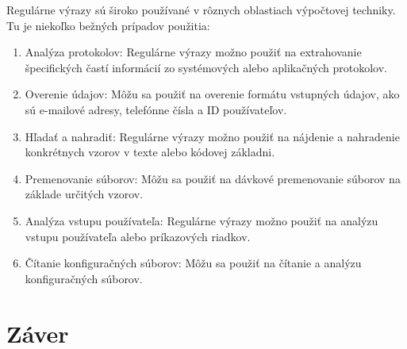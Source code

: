 \documentclass[10pt,twoside,slovak,a4paper]{article}
\begin{document}
	Regulárne výrazy sú široko používané v rôznych oblastiach výpočtovej techniky. Tu je niekoľko bežných prípadov použitia:
	\begin{enumerate}
		\item Analýza protokolov: Regulárne výrazy možno použiť na extrahovanie špecifických častí informácií zo systémových alebo aplikačných protokolov.
		\item Overenie údajov: Môžu sa použiť na overenie formátu vstupných údajov, ako sú e-mailové adresy, telefónne čísla a ID používateľov.
		\item Hľadať a nahradiť: Regulárne výrazy možno použiť na nájdenie a nahradenie konkrétnych vzorov v texte alebo kódovej základni.
		\item Premenovanie súborov: Môžu sa použiť na dávkové premenovanie súborov na základe určitých vzorov.
		\item Analýza vstupu používateľa: Regulárne výrazy možno použiť na analýzu vstupu používateľa alebo príkazových riadkov.
		\item Čítanie konfiguračných súborov: Môžu sa použiť na čítanie a analýzu konfiguračných súborov.
	\end{enumerate}
	



\section{Záver} \label{zaver} %






\end{document}
